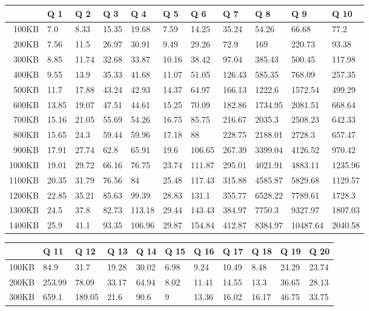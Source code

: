 
\begin {table}[htpb]
\centering
\hspace*{-1.5cm}\begin{tabular}{r|l|l|l|l|l|l|l|l|l|l}
&Q 1&Q 2&Q 3&Q 4&Q 5&Q 6&Q 7&Q 8&Q 9&Q 10\\
\hline
100KB&7.0&8.33&15.35&19.68&7.59&14.25&35.24&54.26&66.68&77.2\\
200KB&7.56&11.5&26.97&30.91&9.49&29.26&72.9&169&220.73&93.38\\
300KB&8.85&11.74&32.68&33.87&10.16&38.42&97.04&385.43&500.45&117.98\\
400KB&9.55&13.9&35.33&41.68&11.07&51.05&126.43&585.35&768.09&257.35\\
500KB&11.7&17.88&43.24&42.93&14.37&64.97&166.13&1222.6&1572.54&499.29\\
600KB&13.85&19.07&47.51&44.61&15.25&70.09&182.86&1734.95&2081.51&668.64\\
700KB&15.16&21.05&55.69&54.26&16.75&85.75&216.67&2035.3&2508.23&642.33\\
800KB&15.65&24.3&59.44&59.96&17.18&88&228.75&2188.01&2728.3&657.47\\
900KB&17.91&27.74&62.8&65.91&19.6&106.65&267.39&3399.04&4126.52&970.42\\
1000KB&19.01&29.72&66.16&76.75&23.74&111.87&295.01&4021.91&4883.11&1235.96\\
1100KB&20.35&31.79&76.56&84&25.48&117.43&315.88&4585.87&5829.68&1129.57\\
1200KB&22.85&35.21&85.63&99.39&28.83&131.1&355.77&6528.22&7789.61&1728.3\\
1300KB&24.5&37.8&82.73&113.18&29.44&143.43&384.97&7750.3&9327.97&1807.03\\
1400KB&25.9&41.1&93.35&106.96&29.87&154.84&412.87&8384.97&10487.64&2040.58\\
\end{tabular}
\newline
\vspace*{0.5 cm}
\newline
\hspace*{-1.5cm}\begin{tabular}{r|l|l|l|l|l|l|l|l|l|l}
&Q 11&Q 12&Q 13&Q 14&Q 15&Q 16&Q 17&Q 18&Q 19&Q 20\\
\hline
100KB&84.9&31.7&19.28&30.02&6.98&9.24&10.49&8.48&24.29&23.74\\
200KB&253.99&78.09&33.17&64.94&8.02&11.41&14.55&13.3&36.65&28.13\\
300KB&659.1&189.05&21.6&90.6&9&13.36&16.02&16.17&46.75&33.75\\

\end{tabular}
\end{table}
